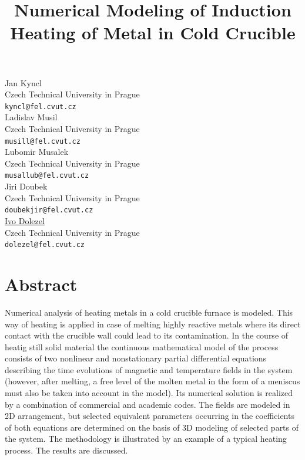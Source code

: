 \documentclass[article,A4,11pt]{llncs}%
\begin{document}
\title{Numerical Modeling of Induction Heating of Metal in Cold Crucible}
 \author{} \institute{}
\maketitle
\begin{center}
{\large Jan  Kyncl}\\
Czech Technical University in Prague\\
{\tt kyncl@fel.cvut.cz}
\\ \vspace{4mm}
{\large Ladislav  Musil}\\
Czech Technical University in Prague\\
{\tt musill@fel.cvut.cz}
\\ \vspace{4mm}
{\large Lubomir Musalek}\\
Czech Technical University in Prague\\
{\tt musallub@fel.cvut.cz}
\\ \vspace{4mm}
{\large Jiri Doubek}\\
Czech Technical University in Prague\\
{\tt doubekjir@fel.cvut.cz}
\\ \vspace{4mm}
{\large \underline{Ivo Dolezel}}\\
Czech Technical University in Prague\\
{\tt dolezel@fel.cvut.cz}
\end{center}

\section*{Abstract}
Numerical analysis of heating metals in a cold crucible furnace is modeled. This way of heating is applied in case of melting highly reactive metals where its direct contact with the crucible wall could lead to its contamination. In the course of heatig still solid material the continuous mathematical model of the process consists of two nonlinear and nonstationary partial differential equations describing the time evolutions of magnetic and temperature fields in the system (however, after melting, a free level of the molten metal in the form of a meniscus must also be taken into account in the model). Its numerical solution is realized by a combination of commercial and academic codes. The fields are modeled in 2D arrangement, but selected equivalent parameters occurring in the coefficients of both equations are determined on the basis of 3D modeling of selected parts of the system. The methodology is illustrated by an example of a typical heating process. The results are discussed. 
\end{document}
